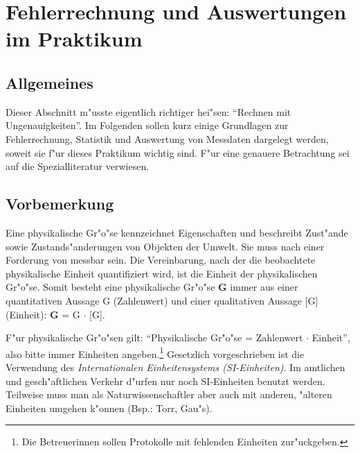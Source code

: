 \chapter{Fehlerrechnung und Auswertungen im Praktikum} \label{v:fehler}

\section{Allgemeines}

Dieser Abschnitt m"usste eigentlich richtiger hei"sen: "`Rechnen mit
Ungenauigkeiten"'. Im Folgenden sollen kurz
einige Grundlagen zur Fehlerrechnung,
Statistik und Auswertung von
Messdaten dargelegt werden, soweit sie f"ur
dieses Praktikum wichtig sind. F"ur eine genauere Betrachtung sei
auf die Spezialliteratur
verwiesen.

\section{Vorbemerkung}

Eine physikalische Gr"o"se kennzeichnet
Eigenschaften und beschreibt Zust"ande sowie Zustands"anderungen von
Objekten der Umwelt. Sie muss nach einer Forderung von
 messbar sein. Die Vereinbarung, nach der die
beobachtete physikalische Einheit quantifiziert wird, ist die
Einheit der physikalischen Gr"o"se. Somit besteht eine physikalische
Gr"o"se {\bf G} immer aus einer quantitativen Aussage G (Zahlenwert)
und einer qualitativen Aussage [G] (Einheit): {\bf G} = G $\cdot$
[G].

F"ur physikalische Gr"o"sen gilt: "`Physikalische Gr"o"se = Zahlenwert
$\cdot$ Einheit"', also bitte immer Einheiten angeben.\footnote{Die
Betreuerinnen sollen Protokolle mit fehlenden Einheiten
zur"uckgeben.} Gesetzlich vorgeschrieben ist die Verwendung des
\emph{Internationalen Einheitensystems
(SI-Einheiten)}. Im amtlichen und gesch"aftlichen
Verkehr d"urfen nur noch SI-Einheiten benutzt werden. Teilweise muss man als Naturwissenschaftler aber
auch mit anderen, "alteren Einheiten umgehen k"onnen (Bsp.: Torr,
Gau"s). %

